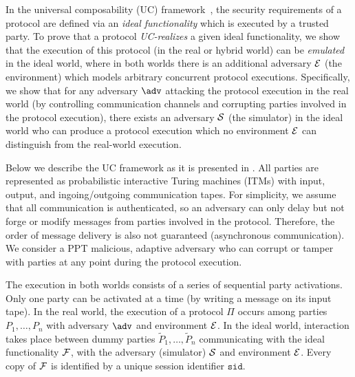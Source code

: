 In the universal composability (UC) framework~\cite{FOCS:Canetti01}, the security requirements of a protocol are defined via an \emph{ideal functionality} which is executed by a trusted party. To prove that a protocol \emph{UC-realizes} a given ideal functionality, we show that the execution of this protocol (in the real or hybrid world) can be \emph{emulated} in the ideal world, where in both worlds there is an additional adversary $\mathcal{E}$ (the environment) which models arbitrary concurrent protocol executions. Specifically, we show that for any adversary $\adv$ attacking the protocol execution in the real world (by controlling communication channels and corrupting parties involved in the protocol execution), there exists an adversary $\mathcal{S}$ (the simulator) in the ideal world who can produce a protocol execution which no environment $\mathcal{E}$ can distinguish from the real-world execution.

Below we describe the UC framework as it is presented in \cite{EPRINT:CLOS02}. 
All parties are represented as probabilistic interactive Turing machines (ITMs) with input, output, and ingoing/outgoing communication tapes. For simplicity, we assume that all communication is authenticated, so an adversary can only delay but not forge or modify messages from parties involved in the protocol. Therefore, the order of message delivery is also not guaranteed (asynchronous communication). We consider a PPT malicious, adaptive adversary who can corrupt or tamper with parties at any point during the protocol execution.

The execution in both worlds consists of a series of sequential party activations. Only one party can be activated at a time (by writing a message on its input tape). In the real world, the execution of a protocol $\Pi$ occurs among parties $P_1, \dots, P_n$ with adversary $\adv$ and environment $\mathcal{E}$. In the ideal world, interaction takes place between dummy parties $\tilde{P}_1, \dots, \tilde{P}_n$ communicating with the ideal functionality $\mathcal{F}$, with the adversary (simulator) $\mathcal{S}$ and environment $\mathcal{E}$. Every copy of $\mathcal{F}$ is identified by a unique session identifier $\texttt{sid}$. 

